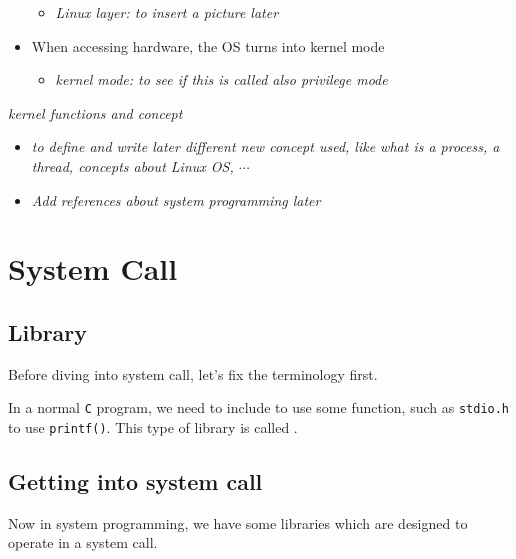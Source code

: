 \documentclass[12pt,a4paper]{book}
\begin{document}
\begin{itemize}
\begin{itemize}
    \item {} \textit{Linux layer: to insert a picture later}
\end{itemize}

\item When accessing hardware, the OS turns into kernel mode

    \begin{itemize}
        \item {} \textit{kernel mode: to see if this is called also privilege mode}
    \end{itemize}

\end{itemize}


 \textit{kernel functions and concept}

\begin{itemize}

\item \textit{to define and write later different new concept used, like what is a process, a  thread, concepts about Linux OS, $\cdots$}

\item \textit{Add references about system programming later}

\end{itemize}


\newpage
\section{System Call}


\subsection{Library}

Before diving into system call, let's fix the terminology first.

In a normal \verb|C| program, we need to include  to use some function, such as \verb|stdio.h| to use \verb|printf()|.
This type of library is called .\\

\subsection{Getting into system call}

Now in system programming, we have some libraries which are designed to operate in a system call.\\
\end{document}
